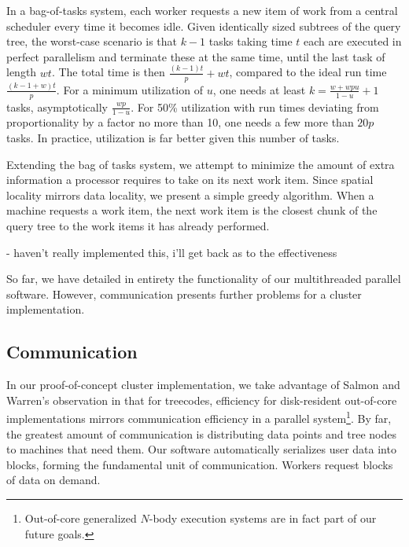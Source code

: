 \documentclass[times, leqno,twocolumn]{article}
\begin{document}
In a bag-of-tasks system, each worker requests a new item of work from a central scheduler every time it becomes idle.
Given identically sized subtrees of the query tree, the worst-case scenario is that $k - 1$ tasks taking time $t$ each are executed in perfect parallelism and terminate these at the same time, until the last task of length $wt$.
The total time is then $\frac{(k-1)t}{p}+wt$, compared to the ideal run time $\frac{(k-1+w)t}{p}$.
For a minimum utilization of $u$, one needs at least $k = \frac{w+wpu}{1-u}+1$ tasks, asymptotically $\frac{wp}{1-u}$.
For 50\% utilization with run times deviating from proportionality by a factor no more than 10, one needs a few more than $20p$ tasks.
In practice, utilization is far better given this number of tasks.

Extending the bag of tasks system, we attempt to minimize the amount of extra information a processor requires to take on its next work item.
Since spatial locality mirrors data locality, we present a simple greedy algorithm.
When a machine requests a work item, the next work item is the closest chunk of the query tree to the work items it has already performed.

- haven't really implemented this, i'll get back as to the effectiveness


So far, we have detailed in entirety the functionality of our multithreaded parallel software.
However, communication presents further problems for a cluster implementation.

\subsection{Communication}

In our proof-of-concept cluster implementation, we take advantage of Salmon and Warren's observation in \cite{salmon97parallel} that for treecodes, efficiency for disk-resident out-of-core implementations mirrors communication efficiency in a parallel system\footnote{Out-of-core generalized $N$-body execution systems are in fact part of our future goals.}.
By far, the greatest amount of communication is distributing data points and tree nodes to machines that need them.
Our software automatically serializes user data into blocks, forming the fundamental unit of communication.
Workers request blocks of data on demand.
\end{document}
